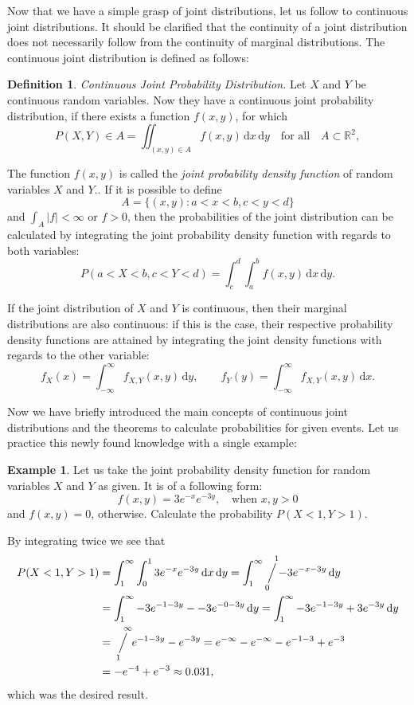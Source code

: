 \documentclass[12pt,a4paper,leqno]{report}
\newcommand{\R}{\mathbb{R}}
\newcommand{\dif}{\,\mathrm{d}}
\newcommand{\sijoitus}[2]{\mathop{\Big/}\limits_{\hspace{-0.85em}{#1}}^{\hspace{0.85em}{#2}}\hspace{-0.2em}}
\theoremstyle{plain}
\theoremstyle{definition}
\newtheorem{maar}[equation]{Definition}
\newtheorem{esim}[equation]{Example}
\begin{document}
Now that we have a simple grasp of joint distributions, let us follow to continuous joint distributions. It should be clarified that the continuity of a joint distribution does not necessarily follow from the continuity of marginal distributions. The continuous joint distribution is defined as follows:

\begin{maar}
\emph{Continuous Joint Probability Distribution.} Let $X$ and $Y$ be continuous random variables. Now they have a continuous joint probability distribution, if there exists a function $f(x,y)$, for which
\[
P(X,Y) \in A = \iint_{(x,y) \in A} f(x,y) \dif{x}\dif{y}  \quad \text{for all} \quad A \subset \R^2,
\]

The function $f(x,y)$ is called the \emph{joint probability density function} of random variables $X$ and $Y$.. If it is possible to define 
\[
A = \{(x,y): a < x < b, c < y < d\}
\]
and $\int_A |f| < \infty$ or $f > 0$, then the probabilities of the joint distribution can be calculated by integrating the joint probability density function with regards to both variables:
\[
P(a < X < b, c < Y < d) = \int_c^d\int_a^bf(x,y)\dif{x}\dif{y}.
\]
\end{maar}

If the joint distribution of $X$ and $Y$ is continuous, then their marginal distributions are also continuous: if this is the case, their respective probability density functions are attained by integrating the joint density functions with regards to the other variable:
\[
f_X(x) = \int_{-\infty}^\infty f_{X,Y}(x,y) \dif{y}, \quad \quad f_Y(y) = \int_{-\infty}^\infty f_{X,Y}(x,y) \dif{x}.
\]

Now we have briefly introduced the main concepts of continuous joint distributions and the theorems to calculate probabilities for given events. Let us practice this newly found knowledge with a single example:

\begin{esim} \label{esim:jpdf}
Let us take the joint probability density function for random variables $X$ and $Y$ as given. It is of a following form:
\[
f(x,y) = 3e^{-x}e^{-3y}, \quad \text{when } x,y > 0 
\]
and $f(x,y) = 0$, otherwise. Calculate the probability $P(X < 1, Y > 1)$. 

By integrating twice we see that
\[
\begin{split}
P(X < 1, Y > 1) &= \int_1^\infty \int_0^1 3e^{-x}e^{-3y} \dif{x} \dif{y} = \int_1^\infty \sijoitus{0}{1} -3e^{-x-3y} \dif{y} \\
&=  \int_1^\infty -3e^{-1-3y} - -3e^{-0-3y} \dif{y}  =  \int_1^\infty -3e^{-1-3y} + 3e^{-3y} \dif{y} \\
&= \sijoitus{1}{\infty} e^{-1-3y} - e^{-3y} = e^{-\infty} - e^{-\infty} - e^{-1-3} + e^{-3}\\
&= -e^{-4} + e^{-3} \approx 0.031,
\end{split}
\]
which was the desired result.
\end{esim}
\end{document}
